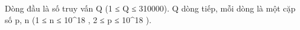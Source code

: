 Dòng đầu là số truy vấn Q (1 ≤ Q ≤ 310000). Q dòng tiếp, mỗi dòng là một cặp số p, n (1 ≤ n ≤ 10^18 , 2 ≤ p ≤ 10^18 ).  

\